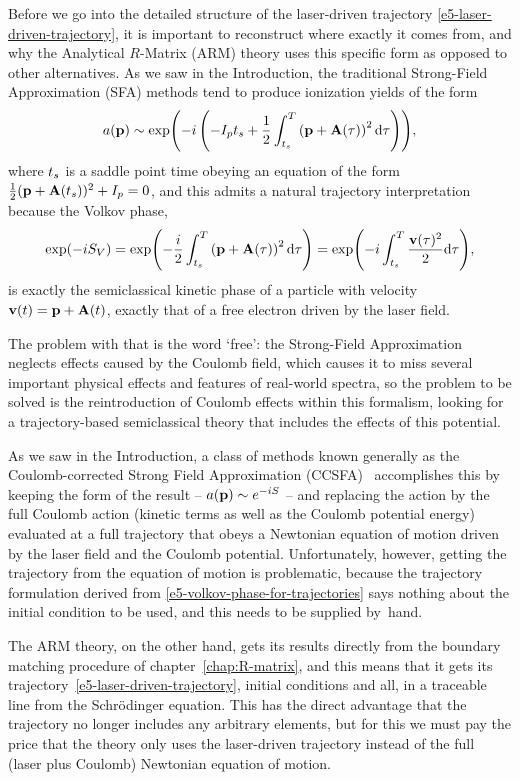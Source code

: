 Before we go into the detailed structure of the laser-driven trajectory \eqref{e5-laser-driven-trajectory}, it is important to reconstruct where exactly it comes from, and why the Analytical $R$-Matrix (ARM) theory uses this specific form as opposed to other alternatives. As we saw in the Introduction, the traditional Strong-Field Approximation (SFA) methods tend to produce ionization yields of the form
\begin{equation}
a(\vb{p})
\sim
\exp(-i\left(
 -I_{p} {t_s} + \frac{1}{2} \int_{{t_s}}^{T}\left(\vb{p}+\vb{A}(\tau)\right)^2\mathrm{d}\tau 
\right))
,
\label{e5-sfa-like-yield}
\end{equation}
where ${t_s}$ is a saddle point time obeying an equation of the form $\frac12 (\vb{p}+\vb{A}({t_s}))^2+I_p = 0$, and this admits a natural trajectory interpretation because the Volkov phase,
\begin{equation}
\exp(-iS_V)
=
\exp(- \frac{i}{2} \int_{{t_s}}^{T}\left(\vb{p}+\vb{A}(\tau)\right)^2\mathrm{d}\tau )
=
\exp(-i\int_{{t_s}}^{T}\frac{\vb{v}(\tau)^2}{2} \mathrm{d}\tau )
,
\label{e5-volkov-phase-for-trajectories}
\end{equation}
is exactly the semiclassical kinetic phase of a particle with velocity $\vb{v}(t) =\vb{p} +\vb{A}(t)$, exactly that of a free electron driven by the laser field.

The problem with that is the word `free': the Strong-Field Approximation neglects effects caused by the Coulomb field, which causes it to miss several important physical effects and features of real-world spectra, so the problem to be solved is the reintroduction of Coulomb effects within this formalism, looking for a trajectory-based semiclassical theory that includes the effects of this potential.

As we saw in the Introduction, a class of methods known generally as the Coulomb-corrected Strong Field Approximation (CCSFA)~\cite{CCSFA_initial_short, CCSFA_initial_full} accomplishes this by keeping the form of the result -- $a(\vb{p})\sim e^{-iS}$ -- and replacing the action by the full Coulomb action (kinetic terms as well as the Coulomb potential energy) evaluated at a full trajectory that obeys a Newtonian equation of motion driven by the laser field and the Coulomb potential. Unfortunately, however, getting the trajectory from the equation of motion is problematic, because the trajectory formulation derived from \eqref{e5-volkov-phase-for-trajectories} says nothing about the initial condition to be used, and this needs to be supplied by~hand.


The ARM theory, on the other hand, gets its results directly from the boundary matching procedure of chapter~\ref{chap:R-matrix}, and this means that it gets its trajectory~\eqref{e5-laser-driven-trajectory}, initial conditions and all, in a traceable line from the Schrödinger equation. This has the direct advantage that the trajectory no longer includes any arbitrary elements, but for this we must pay the price that the theory only uses the laser-driven trajectory instead of the full (laser plus Coulomb) Newtonian equation of motion.

